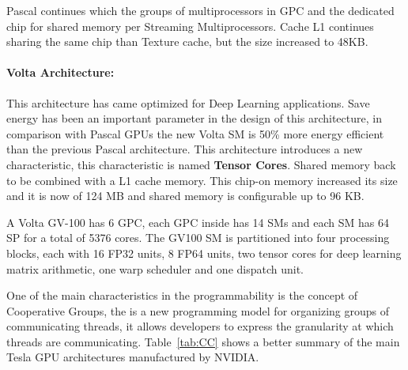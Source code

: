 Pascal continues which the groups of multiprocessors in GPC and the dedicated chip for shared memory per Streaming Multiprocessors. Cache L1 continues sharing the same chip than Texture cache, but the size increased to 48KB.

\paragraph{Volta Architecture:} This architecture has came optimized for Deep Learning applications. Save energy has been an important parameter in the design of this architecture, in comparison with Pascal GPUs the new Volta SM is 50\% more energy efficient than the previous Pascal architecture. This architecture introduces a new characteristic, this characteristic is named \textbf{Tensor Cores}. Shared memory back to be combined with a L1 cache memory. This chip-on memory increased its size and it is now of 124 MB and shared memory is configurable up to 96 KB.

A Volta GV-100 has 6 GPC, each GPC inside has 14 SMs and each SM has 64 SP for a total of 5376 cores. The GV100 SM is partitioned into four processing blocks, each with 16 FP32 units, 8 FP64 units, two tensor cores for deep learning matrix arithmetic, one warp scheduler and one dispatch unit. 

One of the main characteristics in the programmability is the concept of Cooperative Groups, the is a new programming model for organizing groups of communicating threads, it allows developers to express the granularity at which threads are communicating. Table~\ref{tab:CC} shows a better summary of the main Tesla GPU architectures manufactured by NVIDIA.


